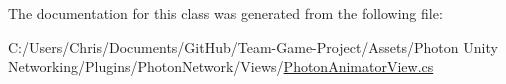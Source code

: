 The documentation for this class was generated from the following file\+:\begin{DoxyCompactItemize}
\item 
C\+:/\+Users/\+Chris/\+Documents/\+Git\+Hub/\+Team-\/\+Game-\/\+Project/\+Assets/\+Photon Unity Networking/\+Plugins/\+Photon\+Network/\+Views/\hyperlink{_photon_animator_view_8cs}{Photon\+Animator\+View.\+cs}\end{DoxyCompactItemize}
